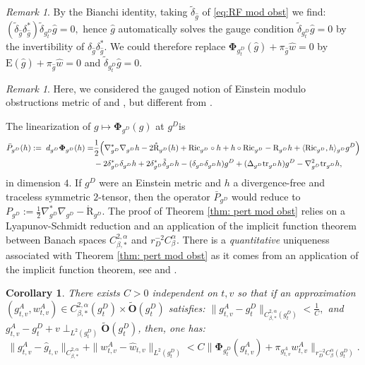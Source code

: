 \documentclass[11pt,reqno]{amsart}
\numberwithin{equation}{section}
\newcommand{\Ric}{{\rm Ric}}
\newcommand{\R}{\mathrm{R}}
\newcommand{\E}{\mathrm{E}}
\newtheorem{cor}[thm]{Corollary}
\theoremstyle{definition}
\theoremstyle{remark}
\newtheorem{remark}[thm]{Remark}
\begin{document}
\begin{remark}
    By the Bianchi identity, taking $\tilde{\delta}_{\hat g}$ of \eqref{eq:RF mod obst} we find:
$(\tilde{\delta}_{\hat g}\delta_{\hat g}^*)\tilde{\delta}_{g^D_{t}}{\hat g} = 0,$
hence ${\hat g}$ automatically solves the gauge condition $\tilde{\delta}_{g^D_{t}}{\hat g} = 0$ by the invertibility of $\delta_{\hat g}\delta_{\hat g}^*$. We could therefore replace $\mathbf{\Phi}_{g^D_{t}}({\hat g}) + \pi_{\hat g} \hat{w} =0$ by $\E({\hat g}) + \pi_{\hat g} \hat{w} =0$ and $\tilde{\delta}_{g^D_{t}}{\hat g} = 0$.
\end{remark}

\begin{remark}\label{rem:gauged modulo obst}
    Here, we considered the gauged notion of Einstein modulo obstructions metric of \cite[Section 6]{biq1} and \cite[Remark 4.56]{ozuthese}, but different from \cite{ozu2}. 
\end{remark}


 The linearization of
$g\mapsto\mathbf{\Phi}_{g^D}(g)$ at $g^D$is
\begin{align}\label{eq:def bar P}
        \bar{P}_{{g^D}}(h):= \;d_{g^D}\mathbf{\Phi}_{g^D}(h) =& \frac1{2}\Big(\nabla^*_{g^D}\nabla_{g^D} h-2\mathring{\R}_{g^D}(h)+\Ric_{g^D}\circ h+h\circ \Ric_{g^D}-\R_{g^D} h+ \langle \Ric_{g^D}, h \rangle_{g^D} {g^D} \Big)\nonumber\\
        &-2 \delta_{g^D}^*\delta_{g^D}h+2\delta^*_{{g^D}}\tilde{\delta}_{g^D} h-(\delta_{g^D}\delta_{g^D} h) {g^D} + (\Delta_{g^D} \textup{tr}_{g^D}h) {g^D} - \nabla_{g^D}^2 \textup{tr}_{g^D} h,
\end{align}
in dimension $4$. If $g^D$ were an Einstein metric and $h$ a divergence-free and traceless symmetric $2$-tensor, then the operator $\bar{P}_{g^D}$ would reduce to $P_{g^D}:= \frac1{2}\nabla_{g^D}^*\nabla_{g^D} - \mathring{\R}_{g^D}.$ The proof of Theorem \ref{thm: pert mod obst} relies on a Lyapunov-Schmidt reduction and an application of the implicit function theorem between Banach spaces $C^{2,\alpha}_{\beta,*}$ and $r_D^{-2}C^{\alpha}_{\beta}$. There is a \textit{quantitative} uniqueness associated with Theorem \ref{thm: pert mod obst} as it comes from an application of the implicit function theorem, see \cite[Section 9]{biq1} and \cite[Section 4]{ozu2}.

\begin{cor}\label{cor: quantitative uniqueness desing}
    There exists $C >0$ independent on $t,v$ so that if an \textit{approximation} $(g^A_{t ,v },w^A_{t ,v })\in C^{2,\alpha}_{\beta,*}(g^D_{t })\times \tilde{\mathbf{O}}(g^D_{t })$ satisfies:  $\|g^A_{t ,v }-g^D_{t }\|_{C^{2,\alpha}_{\beta,*}(g^D_{t })}<\frac1{C},$  and $g^A_{t ,v }-g^D_{t }+v \perp_{L^2(g^D_{t })} \tilde{\mathbf{O}}(g^D_{t })$, then, one has:
\begin{equation}\label{eq:control approx obst thm}
    \|g^A_{t ,v }-\hat g_{t ,v } \|_{C^{2,\alpha}_{\beta,*}} + \|w^A_{t ,v }-\hat w_{t ,v }\|_{L^2(g^D_t)} < C \big\|\mathbf{\Phi}_{g^D_{t }}(g^A_{t ,v }) + \pi_{g^A_{t,v}}w^A_{t ,v } \big\|_{r_D^{-2}C^\alpha_{\beta}(g^D_{t })}.
\end{equation}
\end{cor}
\end{document}
